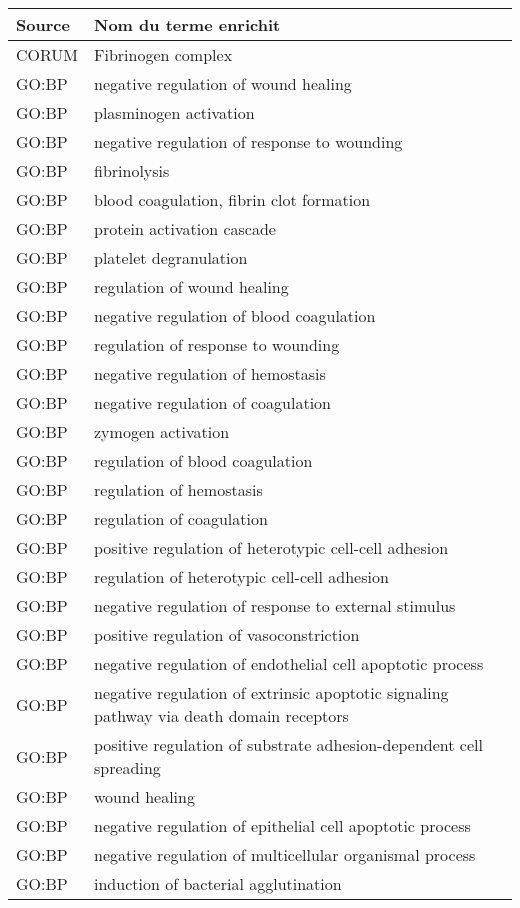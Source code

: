 \begin{longtable}{lp{12cm}}
\toprule
Source & Nom du terme enrichit\\
\midrule
CORUM & Fibrinogen complex\\
GO:BP & negative regulation of wound healing\\
GO:BP & plasminogen activation\\
GO:BP & negative regulation of response to wounding\\
GO:BP & fibrinolysis\\
GO:BP & blood coagulation, fibrin clot formation\\
GO:BP & protein activation cascade\\
GO:BP & platelet degranulation\\
GO:BP & regulation of wound healing\\
GO:BP & negative regulation of blood coagulation\\
GO:BP & regulation of response to wounding\\
GO:BP & negative regulation of hemostasis\\
GO:BP & negative regulation of coagulation\\
GO:BP & zymogen activation\\
GO:BP & regulation of blood coagulation\\
GO:BP & regulation of hemostasis\\
GO:BP & regulation of coagulation\\
GO:BP & positive regulation of heterotypic cell-cell adhesion\\
GO:BP & regulation of heterotypic cell-cell adhesion\\
GO:BP & negative regulation of response to external stimulus\\
GO:BP & positive regulation of vasoconstriction\\
GO:BP & negative regulation of endothelial cell apoptotic process\\
GO:BP & negative regulation of extrinsic apoptotic signaling pathway via death domain receptors\\
GO:BP & positive regulation of substrate adhesion-dependent cell spreading\\
GO:BP & wound healing\\
GO:BP & negative regulation of epithelial cell apoptotic process\\
GO:BP & negative regulation of multicellular organismal process\\
GO:BP & induction of bacterial agglutination\\

\end{longtable}
